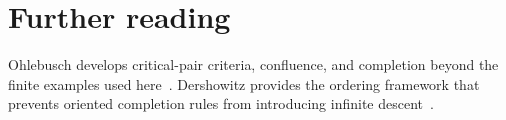 \section{Further reading}
\label{sec:ch84-reading}
Ohlebusch develops critical-pair criteria, confluence, and completion beyond the finite examples used here~\cite{ohlebusch-2002-rewriting}.
Dershowitz provides the ordering framework that prevents oriented completion rules from introducing infinite descent~\cite{dershowitz-1982-orderings}.
